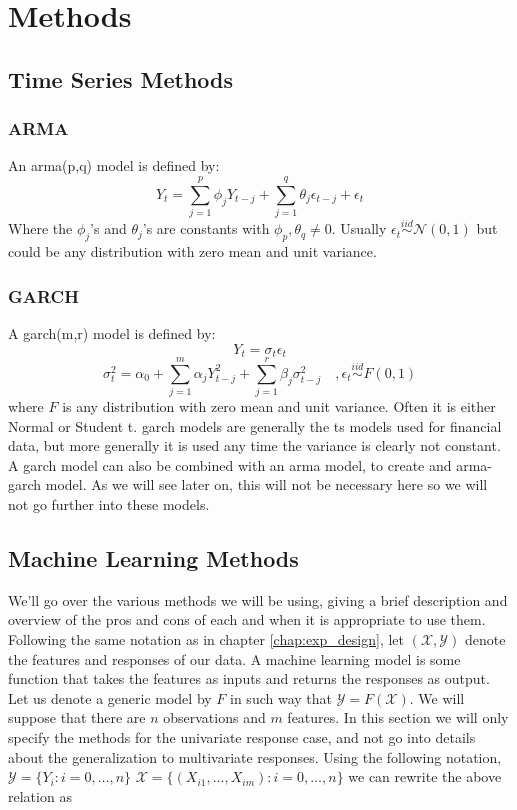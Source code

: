 \chapter{Methods}

\section{Time Series Methods}
\subsection{ARMA}
An \acrfull{arma}(p,q) model is defined by:
$$
Y_t = \sum_{j=1}^p \phi_j Y_{t-j} + \sum_{j=1}^q \theta_j \epsilon_{t-j} + \epsilon_t
$$
Where the $\phi_j$'s and $\theta_j$'s are constants with $\phi_p , \theta_q \neq 0$. Usually $\epsilon_t \stackrel{iid}{\sim} \mathcal{N}(0,1)$ but could be any distribution with zero mean and unit variance.
\subsection{GARCH}
A \acrfull{garch}(m,r) model is defined by:
$$
Y_t = \sigma_t \epsilon_t
$$
$$
\sigma_t^2 = \alpha_0 + \sum_{j=1}^m \alpha_j Y_{t-j}^2 + \sum_{j=1}^r \beta_j \sigma_{t-j}^2
\quad, \epsilon_t \stackrel{iid}{\sim} F(0,1)
$$
where $F$ is any distribution with zero mean and unit variance. Often it is either Normal or Student t.
\acrshort{garch} models are generally the \acrlong{ts} models used for financial data, but more generally it is used any time the variance is clearly not constant. A \acrshort{garch} model can also be combined with an \acrshort{arma} model, to create and \acrshort{arma}-\acrshort{garch} model. As we will see later on, this will not be necessary here so we will not go further into these models.

\section{Machine Learning Methods}
We'll go over the various methods we will be using, giving a brief description and overview of the pros and cons of each and when it is appropriate to use them.
Following the same notation as in chapter \ref{chap:exp_design}, let $(\mathcal{X},\mathcal{Y})$ denote the features and responses of our data. A machine learning model is some function that takes the features as inputs and returns the responses as output. Let us denote a generic model by $F$ in such way that $\mathcal{Y}=F(\mathcal{X})$.
We will suppose that there are $n$ observations and $m$ features. In this section we will only specify the methods for the univariate response case, and not go into details about the generalization to multivariate responses.
Using the following notation, 
$\mathcal{Y}=\{Y_i : i=0,\dots,n\}$
$\mathcal{X}=\{(X_{i1},\dots,X_{im}) : i=0,\dots,n\}$
we can rewrite the above relation as

